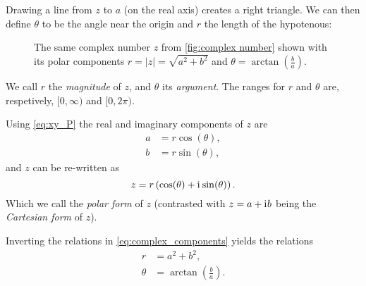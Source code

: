 Drawing a line from $z$ to $a$ (on the real axis) creates a right triangle. We can then define $\theta$ to be the angle near the origin and $r$ the length of the hypotenous:
\begin{figure}
	\centering
	\caption{The same complex number $z$ from \autoref{fig:complex number} shown with its polar components $r=|z|=\sqrt{a^{2}+b^{2}}$ and $\theta=\arctan\left( \frac{b}{a} \right)$.}
	\label{fig:complex number 2}
\end{figure}
We call $r$ the \emph{magnitude} of $z$, and $\theta$ its \emph{argument}. The ranges for $r$ and $\theta$ are, respetively, $[0,\infty)$ and $[0,2\pi)$.

Using \autoref{eq:xy_P} the real and imaginary components of $z$ are
\begin{align}
	a &= r\cos(\theta),\nonumber\\
	b &= r\sin(\theta),
	\label{eq:complex_components}
\end{align}
and $z$ can be re-written as
\begin{equation}
	z = r\left( \cos(\theta) + \mathrm{i}\mkern1mu\sin(\theta) \right).
	\label{eq:complex_geometric_form}
\end{equation}
Which we call the \emph{polar form} of $z$ (contrasted with $z=a+\mathrm{i}\mkern1mu b$ being the \emph{Cartesian form} of $z$).

Inverting the relations in \autoref{eq:complex_components} yields the relations
\begin{align}
	r &= a^{2}+b^{2},\nonumber\\
	\theta &= \arctan\left(\frac{b}{a}\right).
	\label{eq:complex_components_geometric}
\end{align}

